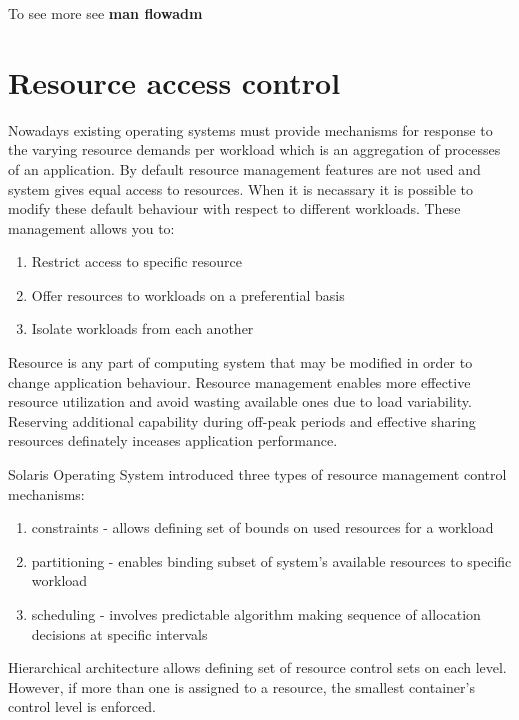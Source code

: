 \documentclass[11pt]{book}
\begin{document}
                        To see more see \textbf{man flowadm}
        

    \section{Resource access control}

                Nowadays existing operating systems must provide mechanisms for response to the varying resource 
		demands per workload which is an aggregation of processes of an application. By default resource management
		features are not used and system gives equal access to resources. When it is necassary it is possible 
		to modify these default behaviour with respect to different workloads. These management allows you to:
		\begin{enumerate}
        	\item{Restrict access to specific resource}
			\item{Offer resources to workloads on a preferential basis}
			\item{Isolate workloads from each another}
		\end{enumerate}
	
		Resource is any part of computing system that may be modified in order to change application behaviour. Resource management enables more 
		effective resource utilization and avoid wasting available ones due to load variability. Reserving additional capability
		during off-peak periods and effective sharing resources definately inceases application performance.
		
		Solaris Operating System introduced three types of resource management control mechanisms:
		\begin{enumerate}
        	\item{constraints - allows defining set of bounds on used resources for a workload}
			\item{partitioning - enables binding subset of system's available resources to specific workload}
			\item{scheduling - involves predictable algorithm making sequence of allocation decisions at specific intervals}
		 \end{enumerate}

                Hierarchical architecture allows defining set of resource control sets on each level. However, if more than one is assigned to a resource, the smallest container's control level is enforced. 
\end{document}
